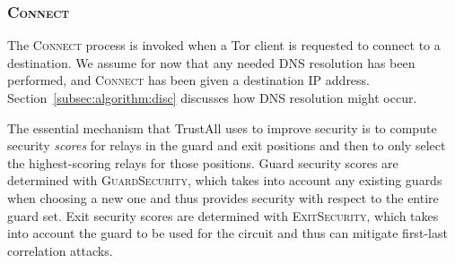 \documentclass[conference]{styles/IEEEtran}
\begin{document}
\subsubsection{\textsc{Connect}}
The \textsc{Connect} process is invoked when a Tor client is requested to connect to a destination.
We assume for now that any needed DNS resolution has been performed, and \textsc{Connect} has been
given a destination IP address. Section~\ref{subsec:algorithm:disc} discusses how DNS resolution
might occur.

The essential mechanism that TrustAll uses to improve security is to compute security
\emph{scores} for relays in the guard and exit positions and then to only select the highest-scoring
relays for those positions. Guard security scores are determined with \textsc{GuardSecurity},
which takes into account any existing guards when choosing a new one and thus provides
security with respect to the entire guard set. Exit security scores are determined with
\textsc{ExitSecurity},
which takes into account the guard to be used for the circuit and thus can mitigate first-last
correlation attacks.
\end{document}
